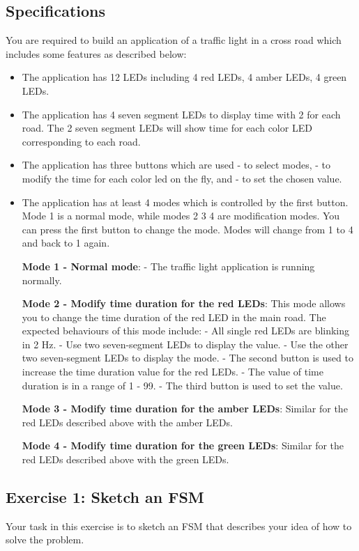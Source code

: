 \subsection{Specifications}
You are required to build an application of a traffic light in a cross road which includes some features as described below:
\begin{itemize}
    \item The application has 12 LEDs including 4 red LEDs, 4 amber LEDs, 4 green LEDs.
    \item The application has 4 seven segment LEDs to display time with 2 for each road. The 2 seven segment LEDs will show time for each color LED corresponding to each road.
    \item The application has three buttons which are used
    \subitem - to select modes, 
    \subitem - to modify the time for each color led on the fly, and 
    \subitem - to set the chosen value. 
    \item The application has at least 4 modes which is controlled by the first button. Mode 1 is a normal mode, while modes 2 3 4 are  modification modes. You can press the first button to change the mode. Modes will change from 1 to 4 and back to 1 again. 
    
    \textbf{Mode 1 - Normal mode}: 
    \subitem - The traffic light application is running normally.   
    
    \textbf{Mode 2 - Modify time duration for the red LEDs}: This mode allows you to change the time duration of the red LED in the main road. The expected behaviours of this mode include:  
    \subitem - All single red LEDs are blinking in 2 Hz. 
    \subitem - Use two seven-segment LEDs to display the value.
    \subitem - Use the other two seven-segment LEDs to display the mode.
    \subitem - The second button is used to increase the time duration value for the red LEDs. 
    \subitem - The value of time duration is in a range of 1 - 99. 
    \subitem - The third button is used to set the value.
    
    
    \textbf{Mode 3 - Modify time duration for the amber LEDs}: Similar for the red LEDs described above with the amber LEDs.
    
    
    \textbf{Mode 4 - Modify time duration for the green LEDs}: Similar for the red LEDs described above with the green LEDs.
\end{itemize}

\newpage
\subsection{Exercise 1: Sketch an FSM}
Your task in this exercise is to sketch an FSM that describes your idea of how to solve the problem.

